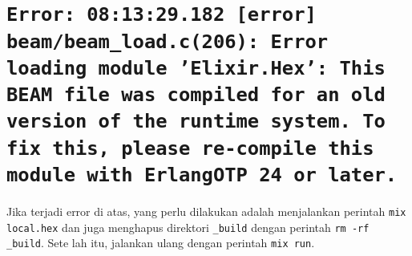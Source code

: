 \section{\texttt{Error: 08:13:29.182 [error] beam/beam\_load.c(206): Error loading module 'Elixir.Hex':
	This BEAM file was compiled for an old version of the runtime system.
	To fix this, please re-compile this module with Erlang\/OTP 24 or later.}}

Jika terjadi error di atas, yang perlu dilakukan adalah menjalankan perintah \texttt{mix local.hex} dan juga menghapus direktori \texttt{\_build} dengan perintah \texttt{rm -rf \_build}. Sete
lah itu, jalankan ulang dengan perintah \texttt{mix run}. 
